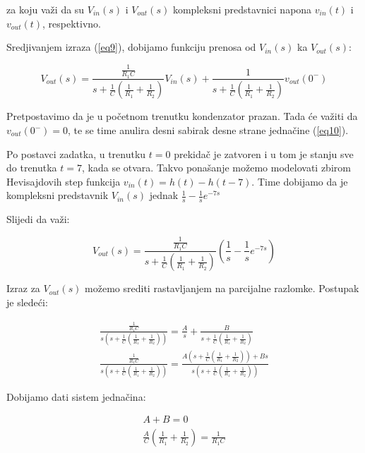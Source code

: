\documentclass{article}
\begin{document}
    za koju važi da su $V_{in}(s)$ i $V_{out}(s)$ kompleksni predstavnici napona $v_{in}(t)$ i $v_{out}(t)$, respektivno.

    Sredjivanjem izraza (\ref{eq9}), dobijamo funkciju prenosa od $V_{in}(s)$ ka $V_{out}(s)$:

    \begin{equation}
        V_{out}(s) = \frac{\frac{1}{R_1C}}{s+\frac{1}{C}(\frac{1}{R_1} + \frac{1}{R_2})}V_{in}(s) + \frac{1}{s+\frac{1}{C}(\frac{1}{R_1} + \frac{1}{R_2})}v_{out}(0^-)
        \label{eq10}
    \end{equation}

    Pretpostavimo da je u početnom trenutku kondenzator prazan. Tada će važiti da $v_{out}(0^-) = 0 $,
    te se time anulira desni sabirak desne strane jednačine (\ref{eq10}).

    Po postavci zadatka, u trenutku $t = 0$ prekidač je zatvoren i u tom je stanju sve do trenutka $t = 7$,
    kada se otvara. Takvo ponašanje možemo modelovati zbirom Hevisajdovih step funkcija $v_{in}(t) = h(t) - h(t - 7)$. 
    Time dobijamo da je kompleksni predstavnik $V_{in}(s)$ jednak $\frac{1}{s} - \frac{1}{s}e^{-7s}$

    Slijedi da važi:

    \begin{equation}
        V_{out}(s) = \frac{\frac{1}{R_1C}}{s+\frac{1}{C}(\frac{1}{R_1} + \frac{1}{R_2})}(\frac{1}{s} - \frac{1}{s}e^{-7s})
    \end{equation}


    Izraz za $V_{out}(s)$ možemo srediti rastavljanjem na parcijalne razlomke. Postupak je sledeći:

    \begin{equation}
        \begin{split}
            \frac{\frac{1}{R_1C}}{s(s + \frac{1}{C}(\frac{1}{R_1} + \frac{1}{R_2}))} = \frac{A}{s} + \frac{B}{s + \frac{1}{C}(\frac{1}{R_1} + \frac{1}{R_2})} \\
            \frac{\frac{1}{R_1C}}{s(s + \frac{1}{C}(\frac{1}{R_1} + \frac{1}{R_2}))} = \frac{A(s + \frac{1}{C}(\frac{1}{R_1} + \frac{1}{R_2})) + Bs}{s(s + \frac{1}{C}(\frac{1}{R_1} + \frac{1}{R_2}))} 
        \end{split}
    \end{equation}

    Dobijamo dati sistem jednačina:

    \begin{equation}
        \begin{split}
            A + B = 0 \\
            \frac{A}{C}(\frac{1}{R_1} + \frac{1}{R_2}) = \frac{1}{R_1C}
        \end{split}
    \end{equation}
\end{document}
